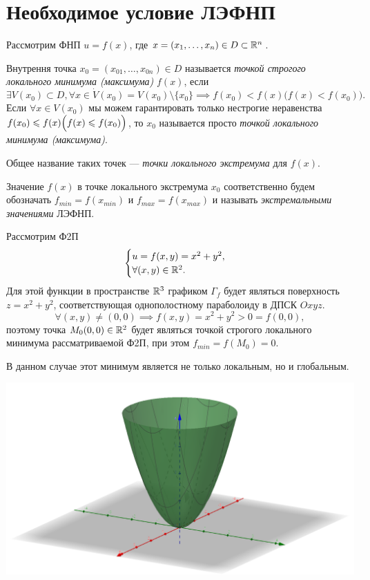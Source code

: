 \documentclass[../../main.tex]{subfiles}
\begin{document}
	\section{Необходимое условие ЛЭФНП}
	Рассмотрим ФНП $u = f (x)$,
	где $x = (x_1, \ldots, x_n) \in D \subset \R^n$.
	
	Внутрення точка $x_0 = (x_{0 1}, \ldots, x_{0n}) \in D$
	называется \emph{точкой строгого локального минимума (максимума)}
	$f(x)$,
	если
	\[
		\exists V (x_0) \subset D,
		\forall x \in \dot{V} (x_0)
		= V (x_0) \setminus \{x_0\}
		\implies f (x_0) < f (x)
		\Big(f (x) < f (x_0)\Big).
	\]
	Если $\forall x \in V (x_0)$ мы можем гарантировать
	только нестрогие неравенства $f (x_0) \le f (x)
	\\ \displaystyle
	\Big(f (x) \le f (x_0)\Big)$,
	то $x_0$ называется просто \emph{точкой локального минимума (максимума)}.
	
	Общее название таких точек
	--- \emph{точки локального экстремума} для $f (x)$.
	
	Значение $f (x)$ в точке локального экстремума $x_0$
	соответственно будем обозначать
	$f_{min} = f (x_{min})$ и $f_{max} = f (x_{max})$
	и называть \emph{экстремальными значениями} ЛЭФНП.
	
	\begin{exmp}
		Рассмотрим Ф2П
		\[
		\begin{cases}
			u = f (x, y) = x^2 + y^2, \\
			\forall (x, y) \in \R^2. \\
		\end{cases}
		\]
		Для этой функции в пространстве $\R^3$ графиком $\Gamma_f$
		будет являться поверхность $z = x^2 + y^2$,
		соответствующая однополостному параболоиду в ДПСК $Oxyz$.
		\[
			\forall (x, y) \ne (0, 0)
			\implies
			f (x, y) = x^2 + y^2 > 0 = f (0, 0),
		\]
		поэтому точка $M_0 (0, 0) \in \R^2$
		будет являться точкой строгого локального минимума рассматриваемой Ф2П,
		при этом $f_{min} = f (M_0) = 0$.
		
		В данном случае
		этот минимум является не только локальным, но и глобальным.
		
		\includegraphics[width=0.9\linewidth]{Ellyptic_paraboloid}
		
	\end{exmp}
	
\end{document}
